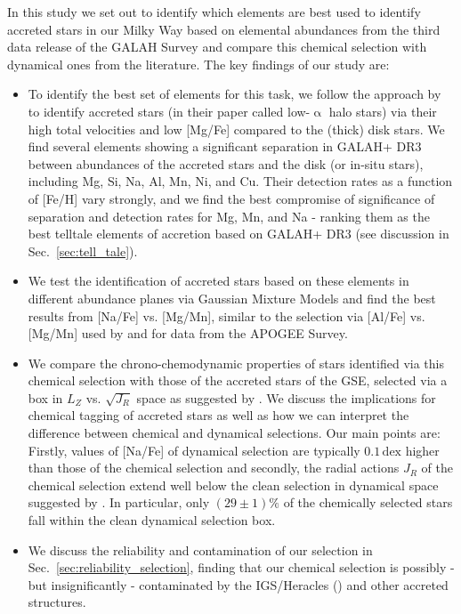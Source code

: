 \documentclass[fleqn,usenatbib]{mnras}
\newcommand{\dex}{\,\mathrm{dex}}	%
\begin{document}
In this study we set out to identify which elements are best used to identify accreted stars in our Milky Way based on elemental abundances from the third data release of the GALAH Survey \citep{Buder2021} and compare this chemical selection with dynamical ones from the literature. The key findings of our study are:
\begin{itemize}
\item To identify the best set of elements for this task, we follow the approach by \citet{Nissen2010} to identify accreted stars (in their paper called low-$\upalpha$ halo stars) via their high total velocities and low [Mg/Fe] compared to the (thick) disk stars. We find several elements showing a significant separation in GALAH+ DR3 between abundances of the accreted stars and the disk (or in-situ stars), including Mg, Si, Na, Al, Mn, Ni, and Cu. Their detection rates as a function of [Fe/H] vary strongly, and we find the best compromise of significance of separation and detection rates for Mg, Mn, and Na - ranking them as the best telltale elements of accretion based on GALAH+ DR3 (see discussion in Sec.~\ref{sec:tell_tale}).
\item We test the identification of accreted stars based on these elements in different abundance planes via Gaussian Mixture Models and find the best results from [Na/Fe] vs. [Mg/Mn], similar to the selection via [Al/Fe] vs. [Mg/Mn] used by \citet{Hawkins2015} and \citet{Das2020} for data from the APOGEE Survey. 
\item We compare the chrono-chemodynamic properties of stars identified via this chemical selection with those of the accreted stars of the GSE, selected via a box in $L_Z$ vs. $\sqrt{J_R}$ space as suggested by \citet{Feuillet2021}. We discuss the implications for chemical tagging of accreted stars as well as how we can interpret the difference between chemical and dynamical selections. Our main points are: Firstly, values of [Na/Fe] of dynamical selection are typically $0.1\dex$ higher than those of the chemical selection and secondly, the radial actions $J_R$ of the chemical selection extend well below the clean selection in dynamical space suggested by \citet{Feuillet2021}. In particular, only $(29\pm1)\%$ of the chemically selected stars fall within the clean dynamical selection box. \item We discuss the reliability and contamination of our selection in Sec.~\ref{sec:reliability_selection}, finding that our chemical selection is possibly - but insignificantly - contaminated by the IGS/Heracles () and other accreted structures.

\end{itemize}
\end{document}
